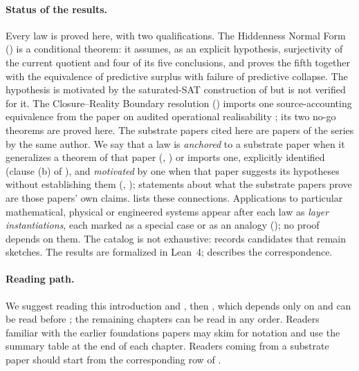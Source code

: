 \paragraph{Status of the results.}
Every law is proved here, with two qualifications.  The Hiddenness
Normal Form () is a conditional theorem: it assumes, as an
explicit hypothesis, surjectivity of the current quotient and four of
its five conclusions, and proves the fifth together with the
equivalence of predictive surplus with failure of predictive collapse.
The hypothesis is motivated by the saturated-SAT construction of
\citet{Tsiokos2026PvNP} but is not verified for it.  The
Closure--Reality Boundary resolution () imports one
source-accounting equivalence from the paper on audited operational
realisability \citep{Tsiokos2026AOR}; its two no-go theorems are proved
here.  The substrate papers cited here are papers of the series by the same
author.  We say that a law is \emph{anchored} to a substrate paper when
it generalizes a theorem of that paper (, ) or
imports one, explicitly identified (clause (b) of ), and \emph{motivated} by one when that paper suggests its
hypotheses without establishing them (, );
statements about what the substrate papers prove are those papers' own
claims.   lists these connections.  Applications to particular
mathematical, physical or engineered systems appear after each law as
\emph{layer instantiations}, each marked as a special case or as an
analogy (); no proof depends on them.  The
catalog is not exhaustive:  records candidates that
remain sketches.  The results are formalized in Lean~4;
 describes the correspondence.

\paragraph{Reading path.}
We suggest reading this introduction and , then
, which depends only on  and
can be read before ; the remaining
chapters can be read in any order.  Readers familiar with the earlier
foundations papers may skim  for notation and use
the summary table at the end of each chapter.  Readers coming from a
substrate paper should start from the corresponding row of
.

